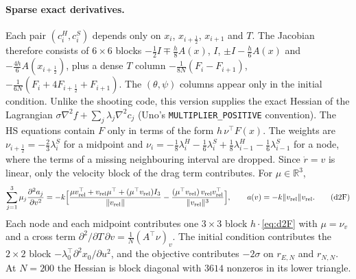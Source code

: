 \documentclass[11pt]{article}
\newcommand{\R}{\mathbb{R}}
\begin{document}
\paragraph{Sparse exact derivatives.} Each pair $(c^H_i, c^S_i)$ depends only on $x_i$,
$x_{i+\frac12}$, $x_{i+1}$ and $T$. The Jacobian therefore consists of $6\times6$ blocks
$-\tfrac12 I \mp \tfrac h8 A(x)$, $I$, $\pm I - \tfrac h6 A(x)$ and $-\tfrac{4h}{6}A(x_{i+\frac12})$, plus a
dense $T$ column $-\tfrac1{8N}(F_i - F_{i+1})$, $-\tfrac1{6N}(F_i + 4F_{i+\frac12} + F_{i+1})$. The
$(\theta,\psi)$ columns appear only in the initial condition. Unlike the shooting code, this
version supplies the exact Hessian of the Lagrangian
$\sigma\nabla^2 f + \sum_j \lambda_j \nabla^2 c_j$ (Uno's \texttt{MULTIPLIER\_POSITIVE} convention).
The HS equations contain $F$ only in terms of the form $h\,\nu^\top F(x)$. The weights are
$\nu_{i+\frac12} = -\tfrac23\lambda^S_i$ for a midpoint and
$\nu_i = -\tfrac18\lambda^H_i - \tfrac16\lambda^S_i + \tfrac18\lambda^H_{i-1} - \tfrac16\lambda^S_{i-1}$ for a
node, where the terms of a missing neighbouring interval are dropped. Since $\dot r = v$ is linear,
only the velocity block of the drag term contributes. For $\mu\in\R^3$,
\begin{equation}
  \sum_{j=1}^3 \mu_j \frac{\partial^2 a_j}{\partial v^2}
  = -k\Bigl[\frac{\mu v_{\mathrm{rel}}^\top + v_{\mathrm{rel}}\mu^\top + (\mu^\top v_{\mathrm{rel}})I_3}{\|v_{\mathrm{rel}}\|}
  - \frac{(\mu^\top v_{\mathrm{rel}})\,v_{\mathrm{rel}}v_{\mathrm{rel}}^\top}{\|v_{\mathrm{rel}}\|^3}\Bigr],
  \qquad a(v) = -k\|v_{\mathrm{rel}}\|v_{\mathrm{rel}}.
  \tag{d2F}\label{eq:d2F}
\end{equation}
Each node and each midpoint contributes one $3\times3$ block $h\cdot$\eqref{eq:d2F} with
$\mu = \nu_v$ and a cross term $\partial^2/\partial T\,\partial v = \tfrac1N (A^\top\nu)_v$. The
initial condition contributes the $2\times2$ block $-\lambda_0^\top \partial^2 x_0/\partial u^2$, and the
objective contributes $-2\sigma$ on $r_{E,N}$ and $r_{N,N}$. At $N=200$ the Hessian is block
diagonal with $3614$ nonzeros in its lower triangle.
\end{document}
